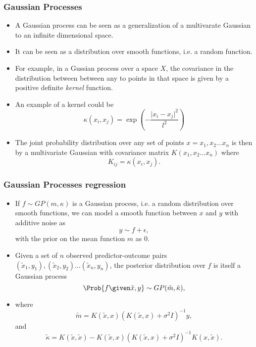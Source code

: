 \documentclass{slides}
\begin{document}
\begin{frame}
	\frametitle{Gaussian Processes}
	\begin{itemize}
		\item A Gaussian process can be seen as a generalization of a multivarate Gaussian to an infinite dimensional space.
		\item It can be seen as a distribution over smooth functions, i.e. a random function.
		\item For example, in a Gussian process over a space $X$, the covariance in the distribution between between any to points in that space is given by a positive definite \emph{kernel} function.
		\item An example of a kernel could be 
			\[
				\kappa(x_i, x_j) = \exp\left( - \frac{\vert x_i - x_j \vert^2}{l^2} \right)
			\]
		\item The joint probability distribution over any set of points $x = x_1, x_2 \ldots x_n$ is then by a multivariate Gaussian with covariance matrix $K(x_1, x_2 \ldots x_n)$ where \[K_{ij} = \kappa(x_i, x_j).\]
	\end{itemize}
\end{frame}

\begin{frame}
	\frametitle{Gaussian Processes regression}
	\begin{itemize}
		\item If $f \sim GP(m, \kappa)$ is a Gaussian process, i.e. a random distribution over smooth functions, we can model a smooth function between $x$ and $y$ with additive noise as 
			\[
				y \sim f + \epsilon,
			\]
		with the prior on the mean function $m$ as $0$.
	\item Given a set of $n$ observed predictor-outcome pairs $(\tilde{x}_1, y_1), (\tilde{x}_2, y_2) \ldots (\tilde{x}_n, y_n)$, the posterior distribution over $f$ is itself a Gaussian process 
		\[ \Prob{f\given \tilde{x}, y} \sim GP(\tilde{m}, \tilde{\kappa}),\]
		\item 
			where 
			\[\tilde{m} = K(\tilde{x}, x) ( K(\tilde{x}, x) + \sigma^2 I)^{-1} y,\]
			and 
			\[\tilde{\kappa} = K(\tilde{x}, \tilde{x}) - K(\tilde{x}, x) ( K(\tilde{x}, x) + \sigma^2 I)^{-1} K(x, \tilde{x}).\]
	\end{itemize}
\end{frame}
\end{document}
